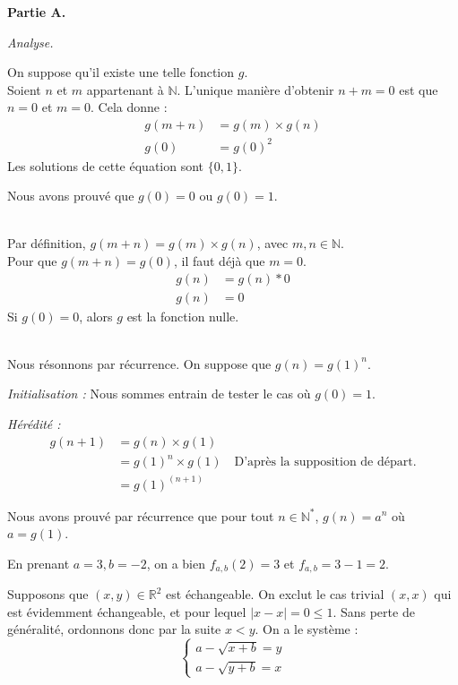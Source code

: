 \documentclass[]{../templates/homework}
\begin{document}
\textbf{Partie A.}

\subproblem
\textit{Analyse.}

On suppose qu'il existe une telle fonction $g$.
\question \\
Soient $n$ et $m$ appartenant à $\mathbb{N}$. L'unique manière d'obtenir $n + m = 0$ est que $n = 0$ et $m = 0$.
Cela donne :
\begin{align*}
	g(m + n) & = g(m) \times g(n) \\
	g(0)     & = g(0)^2
\end{align*}
Les solutions de cette équation sont $\{0, 1\}$.

Nous avons prouvé que $g(0) = 0$ ou $g(0) = 1$.

\question \\
Par définition, $g(m + n) = g(m) \times g(n)$, avec $m, n \in \mathbb{N}$. \\
Pour que $g(m + n) = g(0)$, il faut déjà que $m = 0$.
\begin{align*}
	g(n) & = g(n) * 0 \\
	g(n) & = 0
\end{align*}
Si $g(0) = 0$, alors $g$ est la fonction nulle.

\question \\
Nous résonnons par récurrence. On suppose que $g(n) = g(1)^n$.

\textit{Initialisation :}
Nous sommes entrain de tester le cas où $g(0) = 1$.

\textit{Hérédité :}
\begin{align*}
	g(n + 1) &= g(n) \times g(1) \\
	&= g(1)^n \times g(1) \quad \text{D'après la supposition de départ.} \\
	&= g(1)^{(n + 1)}
\end{align*}

Nous avons prouvé par récurrence que pour tout $n \in \mathbb{N^*}$, $g(n) = a^n$ où $a=g(1)$.

\subproblem
En prenant $a = 3, b=-2$, on a bien $f_{a,b}(2) = 3$ et $f_{a,b} = 3-1 = 2$.
\subproblem

Supposons que $(x,y) \in \mathbb R^2$ est échangeable. On exclut le cas trivial $(x,x)$ qui est évidemment échangeable, et pour lequel $|x-x| = 0 \leq 1$. Sans perte de généralité, ordonnons donc par la suite $x < y$. On a le système :
\begin{equation*}
	\begin{cases}
		a - \sqrt{x+b} = y \\
		a - \sqrt{y+b} = x
	\end{cases}
\end{equation*}
\end{document}
